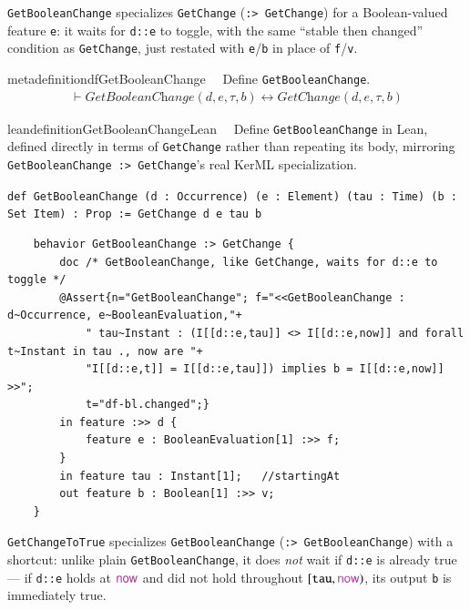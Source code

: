 \pn \texttt{GetBooleanChange} specializes \texttt{GetChange} (\texttt{:> GetChange}) for a Boolean-valued
feature \texttt{e}: it waits for \texttt{d::e} to toggle, with the same ``stable then changed'' condition as
\texttt{GetChange}, just restated with \texttt{e}/\texttt{b} in place of \texttt{f}/\texttt{v}.

\begin{restatable}{metadefinition}{dfGetBooleanChange}~~ Define
\texttt{GetBooleanChange}.
\begin{align}
\vdash \textit{GetBooleanChange}(d,e,\tau,b) \leftrightarrow \textit{GetChange}(d,e,\tau,b)
\label{eq:df-GetBooleanChange}\tag{df-GetBooleanChange}
\end{align}
\end{restatable}

\begin{restatable}{leandefinition}{GetBooleanChangeLean}~~ Define
\texttt{GetBooleanChange} in Lean, defined directly in terms of \texttt{GetChange} rather than repeating its
body, mirroring \texttt{GetBooleanChange :> GetChange}'s real KerML specialization.

\texttt{\textcolor{leancolor}{def} \textcolor{leanyellow}{GetBooleanChange} (d : Occurrence) (e : Element) (tau : Time) (b : Set Item) : Prop := GetChange d e tau b}
\label{GetBooleanChange}
\end{restatable}

\begin{lstlisting}
	behavior GetBooleanChange :> GetChange {
		doc /* GetBooleanChange, like GetChange, waits for d::e to toggle */
		@Assert{n="GetBooleanChange"; f="<<GetBooleanChange : d~Occurrence, e~BooleanEvaluation,"+
			" tau~Instant : (I[[d::e,tau]] <> I[[d::e,now]] and forall t~Instant in tau ., now are "+
			"I[[d::e,t]] = I[[d::e,tau]]) implies b = I[[d::e,now]] >>";
			t="df-bl.changed";}
		in feature :>> d {
			feature e : BooleanEvaluation[1] :>> f;
		}
		in feature tau : Instant[1];   //startingAt
		out feature b : Boolean[1] :>> v;
	}
\end{lstlisting}

\pn \texttt{GetChangeToTrue} specializes \texttt{GetBooleanChange} (\texttt{:> GetBooleanChange}) with a
shortcut: unlike plain \texttt{GetBooleanChange}, it does \emph{not} wait if \texttt{d::e} is already true ---
if \texttt{d::e} holds at $\mathsf{\mc{now}}$ and did not hold throughout $[\texttt{tau},\mathsf{\mc{now}})$,
its output \texttt{b} is immediately true.

